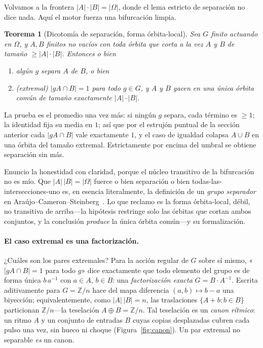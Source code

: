 \documentclass[11pt]{article}
\newtheorem{theorem}{Teorema}
\newcommand{\Z}{\mathbb{Z}}
\begin{document}
Volvamos a la frontera $|A|\cdot|B|=|\Omega|$, donde el lema estricto de separación no
dice nada. Aquí el motor fuerza una bifurcación limpia.

\begin{theorem}[Dicotomía de separación, forma órbita-local]
Sea $G$ finito actuando en $\Omega$, y $A,B$ finitos no vacíos con toda órbita que
corta a la vez $A$ y $B$ de tamaño $\ge|A|\cdot|B|$. Entonces o bien
\begin{enumerate}
\item[\rm(1)] algún $g$ separa $A$ de $B$, o bien
\item[\rm(2)] \emph{(extremal)} $|gA\cap B|=1$ para \emph{todo} $g\in G$, y $A$ y $B$
  yacen en una única órbita común de tamaño exactamente $|A|\cdot|B|$.
\end{enumerate}
\end{theorem}

La prueba es el promedio una vez más: si ningún $g$ separa, cada término es $\ge1$; la
identidad fija su media en $1$; así que por el estrujón puntual de la sección anterior
cada $|gA\cap B|$ vale exactamente $1$, y el caso de igualdad colapsa $A\cup B$ en una
órbita del tamaño extremal. Estrictamente por encima del umbral se obtiene separación
sin más.

Enuncio la honestidad con claridad, porque el núcleo transitivo de la bifurcación no
es mío. Que $|A|\,|B|=|\Omega|$ fuerce o bien separación o bien
todas-las-intersecciones-uno es, en esencia literalmente, la definición de un
\emph{grupo separador} en Araújo--Cameron--Steinberg~\cite{ACS2017}. Lo que reclamo es
la forma órbita-local, débil, no transitiva de arriba---la hipótesis restringe solo las
órbitas que cortan ambos conjuntos, y la conclusión \emph{produce} la única órbita
común---y su formalización.

\paragraph{El caso extremal es una factorización.} ¿Cuáles son los pares extremales?
Para la acción regular de $G$ sobre sí mismo, «$|gA\cap B|=1$ para todo $g$» dice
exactamente que todo elemento del grupo es de forma única $b\,a^{-1}$ con $a\in A$,
$b\in B$: una \emph{factorización exacta} $G=B\cdot A^{-1}$. Escrita aditivamente para
$G=\Z/n$ hace del mapa diferencia $(a,b)\mapsto b-a$ una biyección; equivalentemente,
como $|A|\,|B|=n$, las traslaciones $\{A+b : b\in B\}$ particionan $\Z/n$---la
teselación $A\oplus B=\Z/n$. Tal teselación es un \emph{canon rítmico}: un ritmo $A$ y
un conjunto de entradas $B$ cuyas copias desplazadas cubren cada pulso una vez, sin
hueco ni choque (Figura~\ref{fig:canon}). Un par extremal no separable \emph{es} un
canon.
\end{document}
